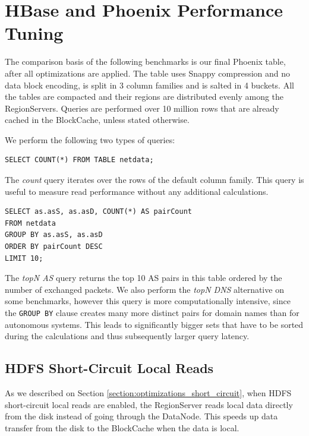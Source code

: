 \section{HBase and Phoenix Performance Tuning}

The comparison basis of the following benchmarks is our final Phoenix table, after all optimizations are applied. The table uses Snappy compression and no data block encoding, is split in 3 column families and is salted in 4 buckets. All the tables are compacted and their regions are distributed evenly among the RegionServers. Queries are performed over 10 million rows that are already cached in the BlockCache, unless stated otherwise.

We perform the following two types of queries:

\begin{lstlisting}[language=PhoenixSQL]
SELECT COUNT(*) FROM TABLE netdata;
\end{lstlisting}

The \emph{count} query iterates over the rows of the default column family. This query is useful to measure read performance without any additional calculations.

\begin{lstlisting}[language=PhoenixSQL]
SELECT as.asS, as.asD, COUNT(*) AS pairCount
FROM netdata
GROUP BY as.asS, as.asD
ORDER BY pairCount DESC
LIMIT 10;
\end{lstlisting}

The \emph{topN AS} query returns the top 10 AS pairs in this table ordered by the number of exchanged packets. We also perform the \emph{topN DNS} alternative on some benchmarks, however this query is more computationally intensive, since the \texttt{GROUP BY} clause creates many more distinct pairs for domain names than for autonomous systems. This leads to significantly bigger sets that have to be sorted during the calculations and thus subsequently larger query latency.

\subsection{HDFS Short-Circuit Local Reads}\label{subsection:benchmarks_hbase_short_circuit}

As we described on Section \ref{section:optimizations_short_circuit}, when HDFS short-circuit local reads are enabled, the RegionServer reads local data directly from the disk instead of going through the DataNode. This speeds up data transfer from the disk to the BlockCache when the data is local.

